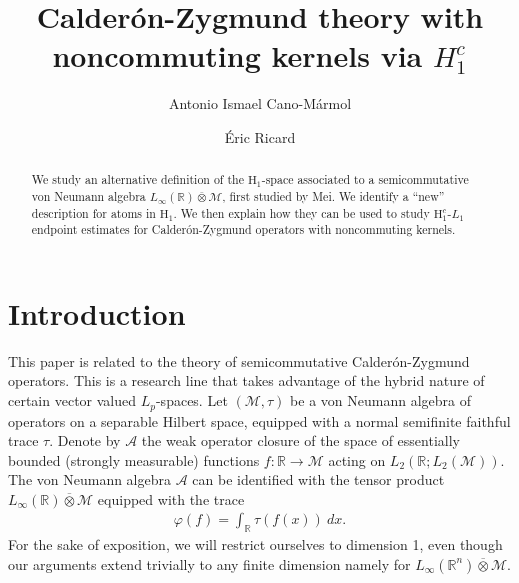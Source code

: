 \documentclass[psamsfonts]{amsart}
\title{Calder\'on-Zygmund theory with noncommuting kernels via $H_1^c$}
\author[A.I. Cano-M\'armol]{Antonio Ismael Cano-M\'armol}
\author[\'E. Ricard]{\'Eric Ricard}
\newcommand{\Lp}{L_p}
\newcommand{\Lone}{L_1}
\newcommand{\Linfty}{L_\infty}
\newcommand{\Hone}{\mathrm{H}_1}
\begin{document}

    
    \maketitle


    \begin{abstract}
    We study an alternative definition of the $\Hone$-space associated to a semicommutative von Neumann algebra $L_\infty(\mathbb{R}) \overline{\otimes} \mathcal{M}$, first studied by Mei. We identify a ``new'' description for atoms in $\Hone$. We then explain how they can be used to study $\Hone^c$-$\Lone$ endpoint estimates for Calder\'on-Zygmund operators with noncommuting kernels.
\end{abstract}



\maketitle

\section*{Introduction}

    This paper is related to the theory of semicommutative
    Calder\'on-Zyg\-mund operators. This is a research line that takes
    advantage of the hybrid nature of certain vector valued $\Lp$-spaces. Let $(\mathcal{M},\tau)$ be a von Neumann algebra of
    operators on a separable Hilbert space, equipped with a normal
    semifinite faithful trace $\tau$. Denote by
    $\mathcal{A}$
    the weak operator closure of the space of essentially bounded
    (strongly measurable) functions
    $f : \mathbb{R} \longrightarrow \mathcal{M}$ acting on $L_2(\mathbb R ; L_2(\mathcal M))$. The
    von Neumann algebra $\mathcal{A}$ can be identified with the
    tensor product
    $\Linfty(\mathbb{R}) \overline{\otimes} \mathcal{M}$ equipped with
    the trace
    \begin{align*}
        \varphi(f) = \int_{\mathbb{R}} \tau(f(x)) \ dx.
    \end{align*}  
    For the sake of
    exposition, we will restrict ourselves to dimension 1, even
    though our arguments extend trivially to any finite dimension namely for $\Linfty(\mathbb R^n) \overline \otimes \mathcal M$.
    
\end{document}
